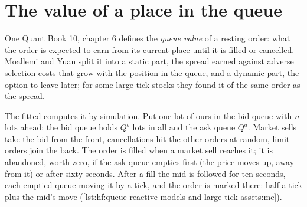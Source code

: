\section{The value of a place in the queue}

One Quant Book 10, chapter 6 defines the \emph{queue value} of a resting order: what the order is expected to earn from its current place until
it is filled or cancelled. Moallemi and Yuan split it into a static part, the spread earned against adverse selection costs that grow with the
position in the queue, and a dynamic part, the option to leave later; for some large-tick stocks they found it of the same order as the spread.

The fitted  computes it by simulation. Put one lot of ours in the bid queue with $n$ lots ahead; the bid queue holds $Q^b$
lots in all and the ask queue $Q^a$. Market sells take the bid from the front, cancellations hit the other orders at random, limit orders join the
back. The order is filled when a market sell reaches it; it is abandoned, worth zero, if the ask queue empties first (the price moves up, away
from it) or after sixty seconds. After a fill the mid is followed for ten seconds, each emptied queue moving it by a tick, and the order is marked
there: half a tick plus the mid's move (\cref{lst:hf:queue-reactive-models-and-large-tick-assets:mc}).

